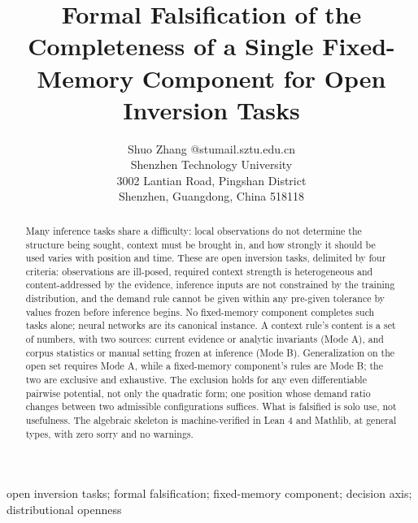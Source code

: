 \documentclass[twoside,11pt]{article}
\begin{document}
\title{Formal Falsification of the Completeness of a Single Fixed-Memory Component for Open Inversion Tasks}

\author{\name Shuo Zhang @stumail.sztu.edu.cn \\
       \addr Shenzhen Technology University\\
       3002 Lantian Road, Pingshan District\\
       Shenzhen, Guangdong, China 518118}


\maketitle

\begin{abstract}%
Many inference tasks share a difficulty: local observations do not determine the structure being sought, context must be brought in, and how strongly it should be used varies with position and time. These are open inversion tasks, delimited by four criteria: observations are ill-posed, required context strength is heterogeneous and content-addressed by the evidence, inference inputs are not constrained by the training distribution, and the demand rule cannot be given within any pre-given tolerance by values frozen before inference begins. No fixed-memory component completes such tasks alone; neural networks are its canonical instance. A context rule's content is a set of numbers, with two sources: current evidence or analytic invariants (Mode A), and corpus statistics or manual setting frozen at inference (Mode B). Generalization on the open set requires Mode A, while a fixed-memory component's rules are Mode B; the two are exclusive and exhaustive. The exclusion holds for any even differentiable pairwise potential, not only the quadratic form; one position whose demand ratio changes between two admissible configurations suffices. What is falsified is solo use, not usefulness. The algebraic skeleton is machine-verified in Lean 4 and Mathlib, at general types, with zero sorry and no warnings.
\end{abstract}

\begin{keywords}
  open inversion tasks; formal falsification; fixed-memory component; decision axis; distributional openness
\end{keywords}
\end{document}
